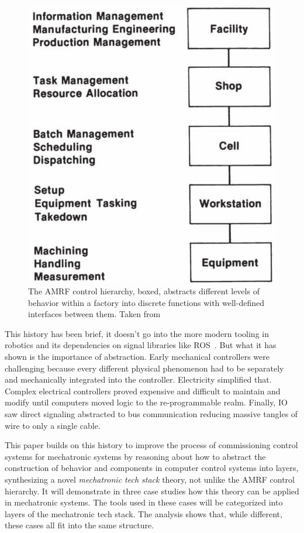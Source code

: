 \documentclass[english,12pt,a4paper,pdftex,eng,utf8]{aaltothesis}
\begin{document}
\begin{figure}
  \centering
  \includegraphics[width=\textwidth]{assets/amrf_control_hierarchy}
  \caption{The AMRF control hierarchy, boxed, abstracts different levels of behavior within a factory into discrete functions with well-defined interfaces between them.  Taken from~\cite{McLean1987}}\label{fig:amrf_control_hierarchy}
\end{figure}

This history has been brief, it doesn't go into the more modern tooling in robotics and its dependencies on signal libraries like ROS~\cite{ROS2}.  But what it has shown is the importance of abstraction.  Early mechanical controllers were challenging because every different physical phenomenon had to be separately and mechanically integrated into the controller.  Electricity simplified that.  Complex electrical controllers proved expensive and difficult to maintain and modify until computers moved logic to the re-programmable realm.  Finally, IO saw direct signaling abstracted to bus communication reducing massive tangles of wire to only a single cable.

This paper builds on this history to improve the process of commissioning control systems for mechatronic systems by reasoning about how to abstract the construction of behavior and components in computer control systems into layers, synthesizing a novel {\it mechatronic tech stack\/} theory, not unlike the AMRF control hierarchy. It will demonstrate in three case studies how this theory can be applied in mechatronic systems. The tools used in these cases will be categorized into layers of the mechatronic tech stack.  The analysis shows that, while different, these cases all fit into the same structure.
\end{document}
